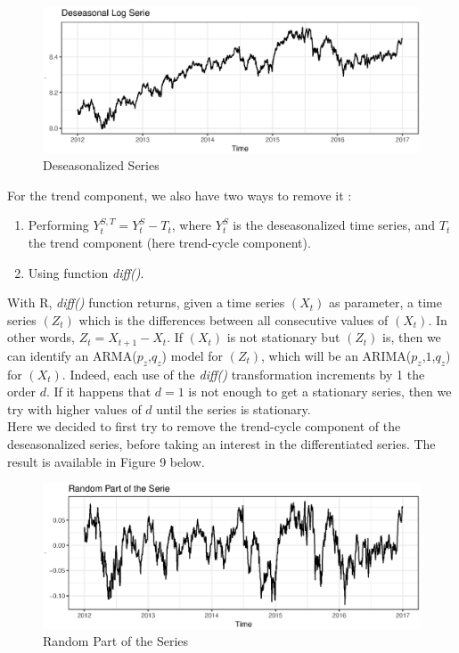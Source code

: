\FloatBarrier
\begin{figure}[!htbp]
  \centering
  \includegraphics[width=\textwidth]{img/Fig7b.eps}
  \caption{Deseasonalized Series}
\end{figure}
\FloatBarrier

For the trend component, we also have two ways to remove it :
\begin{enumerate}
\item Performing $Y_t^{S,T} = Y_t^S - T_t$, where $Y_t^S$ is the deseasonalized time series, and $T_t$ the trend component (here trend-cycle component).
\item Using function \textit{diff()}.
\end{enumerate}

With R, \textit{diff()} function returns, given a time series $(X_t)$ as parameter, a time series $(Z_t)$ which is the differences between all consecutive values of $(X_t)$. In other words, $Z_t = X_{t+1} - X_t$. If $(X_t)$ is not stationary but $(Z_t)$ is, then we can identify an ARMA($p_z$,$q_z$) model for $(Z_t)$, which will be an ARIMA($p_z$,$1$,$q_z$) for $(X_t)$. Indeed, each use of the \textit{diff()} transformation increments by 1 the order $d$. If it happens that $d=1$ is not enough to get a stationary series, then we try with higher values of $d$ until the series is stationary. \\
Here we decided to first try to remove the trend-cycle component of the deseasonalized series, before taking an interest in the differentiated series. The result is available in Figure 9 below.

\FloatBarrier
\begin{figure}[!htbp]
  \centering
  \includegraphics[width=\textwidth]{img/Fig7c.eps}
  \caption{Random Part of the Series}
\end{figure}
\FloatBarrier

